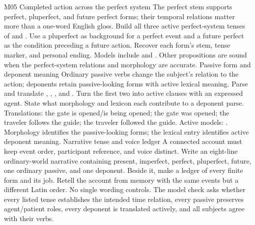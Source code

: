 \begin{courseunit}{M05}
\SubmoduleExtension
  {Completed action across the perfect system}
  {The perfect stem supports perfect, pluperfect, and future perfect forms;
  their temporal relations matter more than a one-word English gloss.}
  {Build all three active perfect-system tenses of  and
  .  Use a pluperfect as background for a perfect event and a
  future perfect as the condition preceding a future action.}
  {Recover each form's stem, tense marker, and personal ending.}
  {Models include  and
  .  Other propositions are sound
  when the perfect-system relations and morphology are accurate.}
\SubmoduleExtension
  {Passive form and deponent meaning}
  {Ordinary passive verbs change the subject's relation to the action;
  deponents retain passive-looking forms with active lexical meaning.}
  {Parse and translate , ,
  , and .  Turn
  the first two into active clauses with an expressed agent.}
  {State what morphology and lexicon each contribute to a deponent parse.}
  {Translations: the gate is opened/is being opened; the gate was opened; the
  traveler follows the guide; the traveler followed the guide.  Active models:
  .  Morphology identifies
  the passive-looking forms; the lexical entry identifies active deponent
  meaning.}
\SubmoduleExtension
  {Narrative tense and voice ledger}
  {A connected account must keep event order, participant reference, and voice
  distinct.}
  {Write an eight-line ordinary-world narrative containing present,
  imperfect, perfect, pluperfect, future, one ordinary passive, and one
  deponent.  Beside it, make a ledger of every finite form and its job.}
  {Retell the account from memory with the same events but a different Latin
  order.}
  {No single wording controls.  The model check asks whether every listed
  tense establishes the intended time relation, every passive preserves
  agent/patient roles, every deponent is translated actively, and all subjects
  agree with their verbs.}
\end{courseunit}

